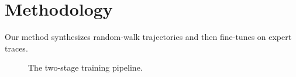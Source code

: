 \section{Methodology}
Our method synthesizes random-walk trajectories and then fine-tunes on expert traces.
\begin{figure}
\caption{The two-stage training pipeline.}
\end{figure}

